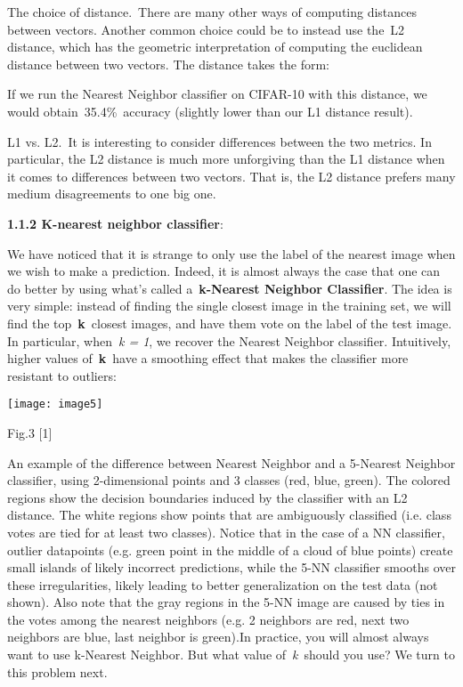 \documentclass{article} %
\begin{document}
\noindent The choice of distance.~There are many other ways of computing distances between vectors. Another common choice could be to instead use the~L2 distance, which has the geometric interpretation of computing the euclidean distance between two vectors. The distance takes the form:

\noindent If we run the Nearest Neighbor classifier on CIFAR-10 with this distance, we would obtain~35.4\%~accuracy (slightly lower than our L1 distance result).

\noindent L1 vs. L2.~It is interesting to consider differences between the two metrics. In particular, the L2 distance is much more unforgiving than the L1 distance when it comes to differences between two vectors. That is, the L2 distance prefers many medium disagreements to one big one. 

\noindent 

\noindent \textbf{1.1.2 K-nearest neighbor classifier}:

\noindent We  have noticed that it is strange to only use the label of the nearest image when we wish to make a prediction. Indeed, it is almost always the case that one can do better by using what's called a~\textbf{k-Nearest Neighbor Classifier}. The idea is very simple: instead of finding the single closest image in the training set, we will find the top~\textbf{k}~closest images, and have them vote on the label of the test image. In particular, when~\textit{k = 1}, we recover the Nearest Neighbor classifier. Intuitively, higher values of~\textbf{k}~have a smoothing effect that makes the classifier more resistant to outliers:

\noindent \texttt{[image: image5]}

\noindent Fig.3   [1]

\noindent An example of the difference between Nearest Neighbor and a 5-Nearest Neighbor classifier, using 2-dimensional points and 3 classes (red, blue, green). The colored regions show the decision boundaries induced by the classifier with an L2 distance. The white regions show points that are ambiguously classified (i.e. class votes are tied for at least two classes). Notice that in the case of a NN classifier, outlier datapoints (e.g. green point in the middle of a cloud of blue points) create small islands of likely incorrect predictions, while the 5-NN classifier smooths over these irregularities, likely leading to better generalization on the test data (not shown). Also note that the gray regions in the 5-NN image are caused by ties in the votes among the nearest neighbors (e.g. 2 neighbors are red, next two neighbors are blue, last neighbor is green).In practice, you will almost always want to use k-Nearest Neighbor. But what value of~\textit{k}~should you use? We turn to this problem next.
\end{document}
